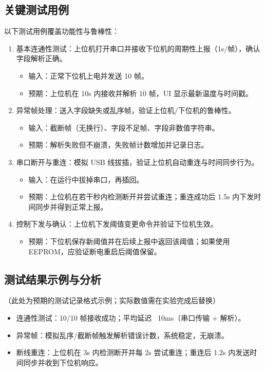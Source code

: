 \documentclass[12pt]{article}
\begin{document}
\subsection{关键测试用例}
以下测试用例覆盖功能性与鲁棒性：
\begin{enumerate}
\item 基本连通性测试：上位机打开串口并接收下位机的周期性上报（1s/帧），确认字段解析正确。
	\begin{itemize}
	\item 输入：正常下位机上电并发送 10 帧。
	\item 预期：上位机在 10s 内接收并解析 10 帧，UI 显示最新温度与时间戳。
	\end{itemize}
\item 异常帧处理：送入字段缺失或乱序帧，验证上位机/下位机的鲁棒性。
	\begin{itemize}
	\item 输入：截断帧（无换行）、字段不足帧、字段非数值字符串。
	\item 预期：解析失败但不崩溃，失败帧计数增加并记录日志。
	\end{itemize}
\item 串口断开与重连：模拟 USB 线拔插，验证上位机自动重连与时间同步行为。
	\begin{itemize}
	\item 输入：在运行中拔掉串口，再插回。
	\item 预期：上位机在若干秒内检测断开并尝试重连；重连成功后 1.5s 内下发时间同步并得到正常上报。
	\end{itemize}
\item 控制下发与确认：上位机下发阈值变更命令并验证下位机生效。
	\begin{itemize}
	\item 预期：下位机保存新阈值并在后续上报中返回该阈值；如果使用 EEPROM，应验证断电重启后阈值保留。
	\end{itemize}
\end{enumerate}

\subsection{测试结果示例与分析}
（此处为预期的测试记录格式示例；实际数值需在实验完成后替换）
\begin{itemize}
\item 连通性测试：10/10 帧接收成功；平均延迟 ~10ms（串口传输 + 解析）。
\item 异常帧：模拟乱序/截断帧触发解析错误计数，系统稳定，无崩溃。
\item 断线重连：上位机在 3s 内检测断开并每 2s 尝试重连；重连后 1.2s 内发送时间同步并收到下位机响应。
\end{itemize}
\end{document}
